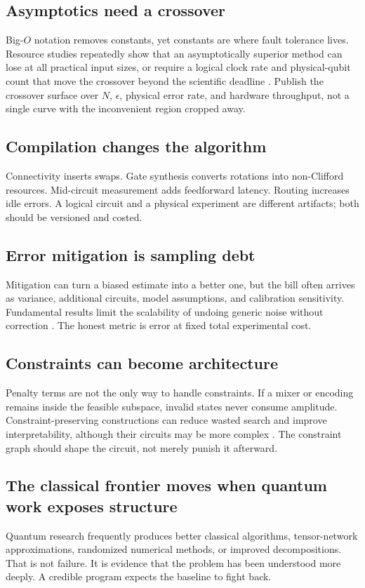 \subsection{Asymptotics need a crossover}

Big-$O$ notation removes constants, yet constants are where fault tolerance lives. Resource studies repeatedly show that an asymptotically superior method can lose at all practical input sizes, or require a logical clock rate and physical-qubit count that move the crossover beyond the scientific deadline \citep{gidney2021,vandam2024}. Publish the crossover surface over $N$, $\epsilon$, physical error rate, and hardware throughput, not a single curve with the inconvenient region cropped away.

\subsection{Compilation changes the algorithm}

Connectivity inserts swaps. Gate synthesis converts rotations into non-Clifford resources. Mid-circuit measurement adds feedforward latency. Routing increases idle errors. A logical circuit and a physical experiment are different artifacts; both should be versioned and costed.

\subsection{Error mitigation is sampling debt}

Mitigation can turn a biased estimate into a better one, but the bill often arrives as variance, additional circuits, model assumptions, and calibration sensitivity. Fundamental results limit the scalability of undoing generic noise without correction \citep{cai2023,quek2024}. The honest metric is error at fixed total experimental cost.

\subsection{Constraints can become architecture}

Penalty terms are not the only way to handle constraints. If a mixer or encoding remains inside the feasible subspace, invalid states never consume amplitude. Constraint-preserving constructions can reduce wasted search and improve interpretability, although their circuits may be more complex \citep{fuchs2024}. The constraint graph should shape the circuit, not merely punish it afterward.

\subsection{The classical frontier moves when quantum work exposes structure}

Quantum research frequently produces better classical algorithms, tensor-network approximations, randomized numerical methods, or improved decompositions. That is not failure. It is evidence that the problem has been understood more deeply. A credible program expects the baseline to fight back.

